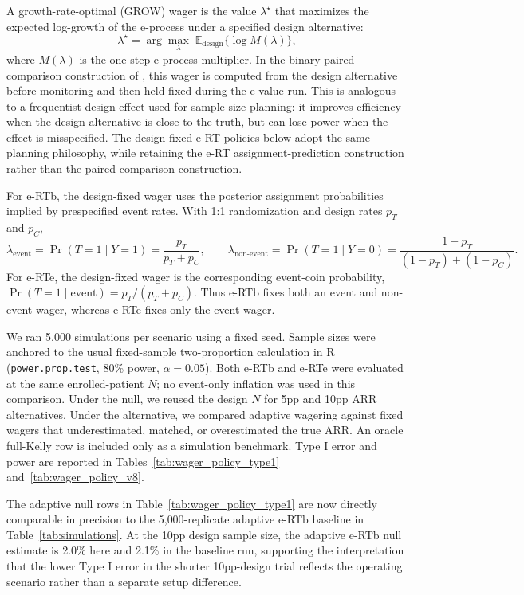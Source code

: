 \documentclass[10pt]{article}
\begin{document}
A growth-rate-optimal (GROW) wager \citep{ramdas2025} is the value $\lambda^\star$ that maximizes the expected log-growth of the e-process under a specified design alternative:
\begin{equation}
\lambda^\star = \arg\max_\lambda \; \mathbb{E}_{\text{design}}\{\log M(\lambda)\},
\end{equation}
where $M(\lambda)$ is the one-step e-process multiplier. In the binary paired-comparison construction of \citet{sokolova2026evalues}, this wager is computed from the design alternative before monitoring and then held fixed during the e-value run. This is analogous to a frequentist design effect used for sample-size planning: it improves efficiency when the design alternative is close to the truth, but can lose power when the effect is misspecified. The design-fixed e-RT policies below adopt the same planning philosophy, while retaining the e-RT assignment-prediction construction rather than the paired-comparison construction.

For e-RTb, the design-fixed wager uses the posterior assignment probabilities implied by prespecified event rates. With 1:1 randomization and design rates $p_T$ and $p_C$,
\begin{equation}
\lambda_{\text{event}} =
\Pr(T = 1 \mid Y = 1)
= \frac{p_T}{p_T + p_C},
\qquad
\lambda_{\text{non-event}} =
\Pr(T = 1 \mid Y = 0)
= \frac{1 - p_T}{(1 - p_T) + (1 - p_C)}.
\end{equation}
For e-RTe, the design-fixed wager is the corresponding event-coin probability, $\Pr(T = 1 \mid \text{event}) = p_T/(p_T + p_C)$. Thus e-RTb fixes both an event and non-event wager, whereas e-RTe fixes only the event wager.

We ran 5{,}000 simulations per scenario using a fixed seed. Sample sizes were anchored to the usual fixed-sample two-proportion calculation in R (\texttt{power.prop.test}, 80\% power, $\alpha = 0.05$). Both e-RTb and e-RTe were evaluated at the same enrolled-patient $N$; no event-only inflation was used in this comparison. Under the null, we reused the design $N$ for 5pp and 10pp ARR alternatives. Under the alternative, we compared adaptive wagering against fixed wagers that underestimated, matched, or overestimated the true ARR. An oracle full-Kelly row is included only as a simulation benchmark. Type I error and power are reported in Tables~\ref{tab:wager_policy_type1} and~\ref{tab:wager_policy_v8}.



The adaptive null rows in Table~\ref{tab:wager_policy_type1} are now directly comparable in precision to the 5{,}000-replicate adaptive e-RTb baseline in Table~\ref{tab:simulations}. At the 10pp design sample size, the adaptive e-RTb null estimate is 2.0\% here and 2.1\% in the baseline run, supporting the interpretation that the lower Type I error in the shorter 10pp-design trial reflects the operating scenario rather than a separate setup difference.
\end{document}
